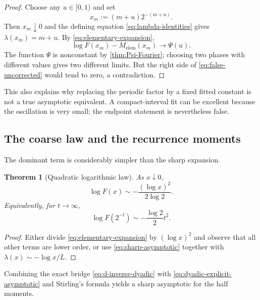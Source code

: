 \documentclass[11pt]{article}
\numberwithin{equation}{section}
\newtheorem{theorem}{Theorem}[section]
\theoremstyle{definition}
\theoremstyle{remark}
\begin{document}
\begin{proof}
Choose any $u\in[0,1)$ and set
\begin{equation}\label{eq:phase-lock-sequence}
 x_m:=(m+u)2^{-(m+u)}.
\end{equation}
Then $x_m\downarrow0$ and the defining equation
\eqref{eq:lambda-identities} gives $\lambda(x_m)=m+u$.  By
\eqref{eq:elementary-expansion},
\begin{equation}\label{eq:phase-lock-limit}
 \log F(x_m)-M_{\mathrm{elem}}(x_m)\longrightarrow\Psi(u).
\end{equation}
The function $\Psi$ is nonconstant by \cref{thm:Psi-Fourier}; choosing two
phases with different values gives two different limits.  But the right side
of \eqref{eq:false-uncorrected} would tend to zero, a contradiction.
\end{proof}

This also explains why replacing the periodic factor by a fixed fitted
constant is not a true asymptotic equivalent.  A compact-interval fit can be
excellent because the oscillation is very small; the endpoint statement is
nevertheless false.

\subsection{The coarse law and the recurrence moments}

The dominant term is considerably simpler than the sharp expansion.

\begin{theorem}[Quadratic logarithmic law]\label{thm:coarse-asymptotic}
As $x\downarrow0$,
\begin{equation}\label{eq:coarse-asymptotic}
 \boxed{
 \log F(x)\sim-\frac{(\log x)^2}{2\log2}.}
\end{equation}
Equivalently, for $t\to\infty$,
\begin{equation}\label{eq:coarse-dyadic}
 \log F(2^{-t})\sim-\frac{\log2}{2}t^2.
\end{equation}
\end{theorem}

\begin{proof}
Either divide \eqref{eq:elementary-expansion} by $(\log x)^2$ and observe that
all other terms are lower order, or use \eqref{eq:sharp-asymptotic} together
with $\lambda(x)\sim-\log x/L$.
\end{proof}

Combining the exact bridge \eqref{eq:d-inverse-dyadic} with
\eqref{eq:dyadic-explicit-asymptotic} and Stirling's formula yields a sharp
asymptotic for the half moments.
\end{document}
